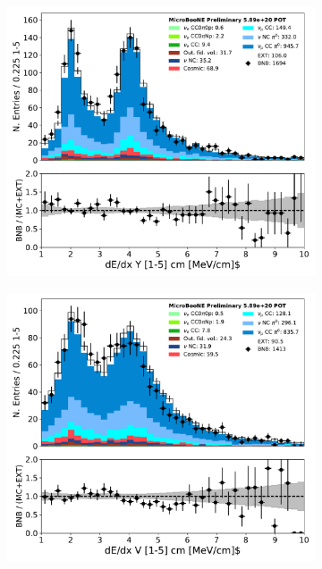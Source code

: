 \begin{figure}[H] 
\begin{center}
    \begin{subfigure}[b]{0.3\textwidth}
    \centering
    \includegraphics[width=1.00\textwidth]{pi0/calorimetry/shr_tkfit_gap10_dedx_Y_03112020_ALL_scaled.pdf}
    \caption{}
    \end{subfigure}
    \begin{subfigure}[b]{0.3\textwidth}
    \centering
    \includegraphics[width=1.00\textwidth]{pi0/calorimetry/shr_tkfit_gap10_dedx_V_03112020_ALL_scaled.pdf}

\end{subfigure}
\end{center}
\end{figure}
